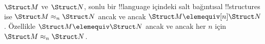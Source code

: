 \begin{cor}
  $\Struct M$ ve $\Struct N$, sonlu bir !!{language} içindeki salt
  bağıntısal !!{structure}s ise $\Struct M\approx_n\Struct N$ ancak ve
  ancak $\Struct M\elemequiv[n]\Struct N$. Özellikle
  $\Struct M\elemequiv\Struct N$ ancak ve ancak her $n$ için
  $\Struct M\approx_n\Struct N$.
\end{cor}


